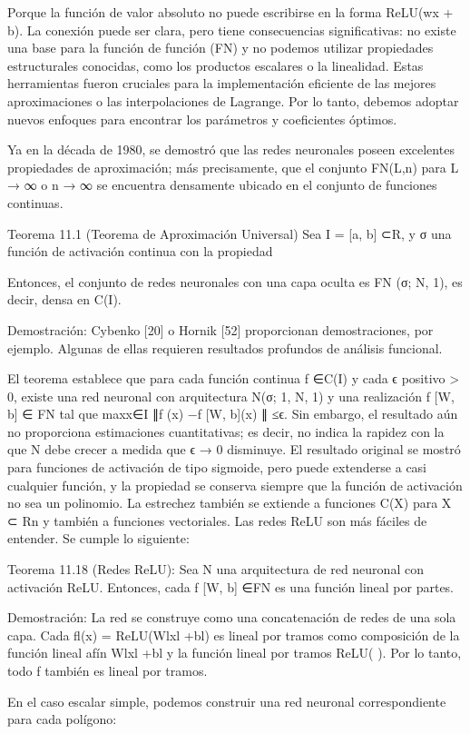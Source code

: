 \begin{frame}
  Porque la función de valor absoluto no puede escribirse en la forma ReLU(wx + b).
  La ​​conexión puede ser clara, pero tiene consecuencias significativas: no existe una base para la función de función (FN) y no podemos utilizar propiedades estructurales conocidas, como los productos escalares o la linealidad. Estas herramientas fueron cruciales para la implementación eficiente de las mejores aproximaciones o las interpolaciones de Lagrange. Por lo tanto, debemos adoptar nuevos enfoques para encontrar los parámetros y coeficientes óptimos.

  Ya en la década de 1980, se demostró que las redes neuronales poseen excelentes propiedades de aproximación; más precisamente, que el conjunto FN(L,n) para L → ∞ o n → ∞ se encuentra densamente ubicado en el conjunto de funciones continuas.

  Teorema 11.1 (Teorema de Aproximación Universal) Sea I = [a, b] ⊂R, y σ una función de activación continua con la propiedad

  Entonces, el conjunto de redes neuronales con una capa oculta es FN (σ; N, 1), es decir, densa en C(I).

  Demostración: Cybenko [20] o Hornik [52] proporcionan demostraciones, por ejemplo. Algunas de ellas requieren resultados profundos de análisis funcional.

  El teorema establece que para cada función continua f ∈C(I) y cada ϵ positivo > 0, existe una red neuronal con arquitectura N(σ; 1, N, 1) y una realización f [W, b] ∈
  FN tal que maxx∈I ∥f (x) −f [W, b](x) ∥ ≤ϵ. Sin embargo, el resultado aún no proporciona estimaciones cuantitativas; es decir, no indica la rapidez con la que N debe crecer a medida que ϵ → 0 disminuye.
  El resultado original se mostró para funciones de activación de tipo sigmoide, pero puede extenderse a casi cualquier función, y la propiedad se conserva siempre que la función de activación no sea un polinomio. La estrechez también se extiende a funciones C(X) para X ⊂ Rn y también a funciones vectoriales.
  Las redes ReLU son más fáciles de entender. Se cumple lo siguiente:

  Teorema 11.18 (Redes ReLU): Sea N una arquitectura de red neuronal con activación ReLU. Entonces, cada f [W, b] ∈FN es una función lineal por partes.

  Demostración: La red se construye como una concatenación de redes de una sola capa. Cada fl(x) = ReLU(Wlxl +bl) es lineal por tramos como composición de la función lineal afín Wlxl +bl y la función lineal por tramos ReLU( ). Por lo tanto, todo f también es lineal por tramos.

  En el caso escalar simple, podemos construir una red neuronal correspondiente para cada polígono:
\end{frame}

